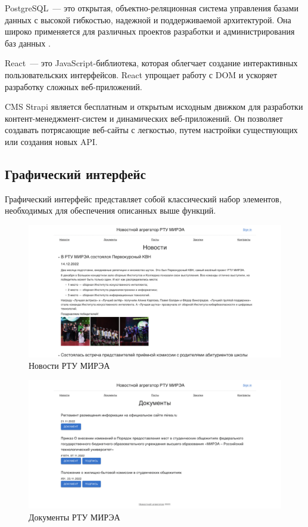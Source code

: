 \documentclass{mirea}
\begin{document}
	PostgreSQL~--- это открытая, объектно-реляционная система управления базами данных с высокой гибкостью, надежной и поддерживаемой архитектурой. Она широко применяется для различных проектов разработки и администрирования баз данных \cite{bib:uorlsy}.
	
	React~--- это JavaScript-библиотека, которая облегчает создание интерактивных пользовательских интерфейсов. React упрощает работу с DOM и ускоряет разработку сложных веб-приложений.
	
	CMS Strapi является бесплатным и открытым исходным движком для разработки контент-менеджмент-систем и динамических веб-приложений. Он позволяет создавать потрясающие веб-сайты с легкостью, путем настройки существующих или создания новых API.
	
	
	\subsection{Графический интерфейс}
	
	Графический интерфейс представляет собой классический набор
	элементов, необходимых для обеспечения описанных выше функций.
	
	\begin{figure}[H]
		\centering
		\includegraphics[width=\textwidth]{screen_news}
		\parskip=6pt
		\caption{Новости РТУ МИРЭА}
		\label{fig:screen_news}
	\end{figure}

	\begin{figure}[H]
		\centering
		\includegraphics[width=\textwidth]{screen_docs}
		\parskip=6pt
		\caption{Документы РТУ МИРЭА}
	\end{figure}
\end{document}
